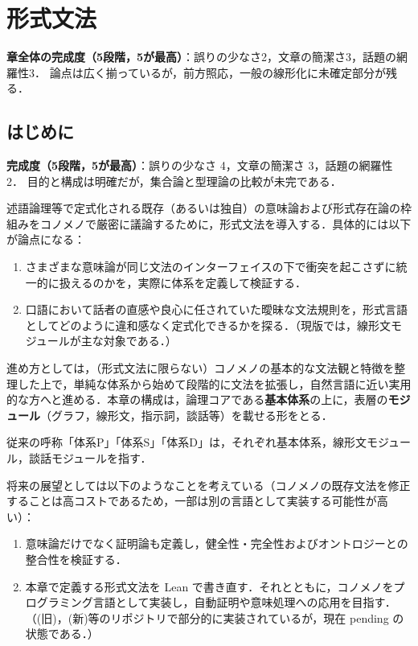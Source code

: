 \documentclass[../../main-detail.tex]{subfiles}
\begin{document}
\chapter{形式文法}
\begin{leftwavybox}
\textbf{章全体の完成度（5段階，5が最高）}：誤りの少なさ2，文章の簡潔さ3，話題の網羅性3．
論点は広く揃っているが，前方照応，一般の線形化に未確定部分が残る．
\end{leftwavybox}
\section{はじめに}
\begin{leftwavybox}
\textbf{完成度（5段階，5が最高）}：誤りの少なさ 4，文章の簡潔さ 3，話題の網羅性 2．
目的と構成は明確だが，集合論と型理論の比較が未完である．
\end{leftwavybox}
述語論理等で定式化される既存（あるいは独自）の意味論および形式存在論の枠組みをコノメノで厳密に議論するために，形式文法を導入する．具体的には以下が論点になる：
\begin{enumerate}
    \item さまざまな意味論が同じ文法のインターフェイスの下で衝突を起こさずに統一的に扱えるのかを，実際に体系を定義して検証する．
    \item 口語において話者の直感や良心に任されていた曖昧な文法規則を，形式言語としてどのように違和感なく定式化できるかを探る．（現版では，線形文モジュールが主な対象である．）
\end{enumerate}
進め方としては，（形式文法に限らない）コノメノの基本的な文法観と特徴を整理した上で，単純な体系から始めて段階的に文法を拡張し，自然言語に近い実用的な方へと進める．本章の構成は，論理コアである\textbf{基本体系}の上に，表層の\textbf{モジュール}（グラフ，線形文，指示詞，談話等）を載せる形をとる．
\begin{remark}
    従来の呼称「体系P」「体系S」「体系D」は，それぞれ基本体系，線形文モジュール，談話モジュールを指す．
\end{remark}
将来の展望としては以下のようなことを考えている（コノメノの既存文法を修正することは高コストであるため，一部は別の言語として実装する可能性が高い）：
\begin{enumerate}
    \item 意味論だけでなく証明論も定義し，健全性・完全性およびオントロジーとの整合性を検証する．
    \item 本章で定義する形式文法を Lean で書き直す．それとともに，コノメノをプログラミング言語として実装し，自動証明や意味処理への応用を目指す．（\cite{auto-prover}(旧)，\cite{formalization}(新)等のリポジトリで部分的に実装されているが，現在 pending の状態である．）
\end{enumerate}
\end{document}
